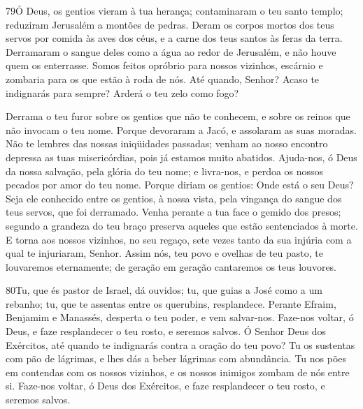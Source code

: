 \bigskip

\lettrine{79}{}Ó Deus, os gentios vieram à tua herança;
contaminaram o teu santo templo; reduziram Jerusalém a montões de
pedras. Deram os corpos mortos dos teus servos por comida às
aves dos céus, e a carne dos teus santos às feras da terra.
Derramaram o sangue deles como a água ao redor de Jerusalém, e
não houve quem os enterrasse. Somos feitos opróbrio para nossos
vizinhos, escárnio e zombaria para os que estão à roda de nós.
Até quando, Senhor? Acaso te indignarás para sempre? Arderá o
teu zelo como fogo?

Derrama o teu furor sobre os gentios que não te conhecem, e sobre
os reinos que não invocam o teu nome. Porque devoraram a Jacó, e
assolaram as suas moradas. Não te lembres das nossas iniqüidades
passadas; venham ao nosso encontro depressa as tuas misericórdias,
pois já estamos muito abatidos. Ajuda-nos, ó Deus da nossa
salvação, pela glória do teu nome; e livra-nos, e perdoa os nossos
pecados por amor do teu nome. Porque diriam os gentios: Onde
está o seu Deus? Seja ele conhecido entre os gentios, à nossa vista,
pela vingança do sangue dos teus servos, que foi derramado.
Venha perante a tua face o gemido dos presos; segundo a
grandeza do teu braço preserva aqueles que estão sentenciados à
morte. E torna aos nossos vizinhos, no seu regaço, sete vezes
tanto da sua injúria com a qual te injuriaram, Senhor. Assim
nós, teu povo e ovelhas de teu pasto, te louvaremos eternamente; de
geração em geração cantaremos os teus louvores.

\bigskip

\lettrine{80}{}Tu, que és pastor de Israel, dá ouvidos; tu, que
guias a José como a um rebanho; tu, que te assentas entre os
querubins, resplandece. Perante Efraim, Benjamim e Manassés,
desperta o teu poder, e vem salvar-nos. Faze-nos voltar, ó Deus,
e faze resplandecer o teu rosto, e seremos salvos. Ó Senhor Deus
dos Exércitos, até quando te indignarás contra a oração do teu povo?
Tu os sustentas com pão de lágrimas, e lhes dás a beber lágrimas
com abundância. Tu nos pões em contendas com os nossos vizinhos,
e os nossos inimigos zombam de nós entre si. Faze-nos voltar, ó
Deus dos Exércitos, e faze resplandecer o teu rosto, e seremos
salvos.

